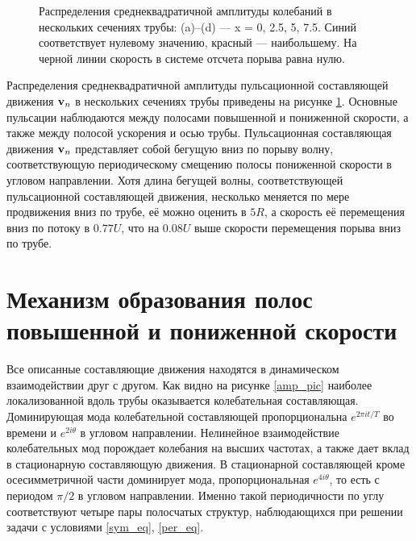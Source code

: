\begin{figure}[h]
\caption{Распределения среднеквадратичной амплитуды колебаний в нескольких сечениях трубы: (a)--(d) --- x = 0, 2.5, 5, 7.5. Синий соответствует нулевому значению, красный --- наибольшему. На черной линии скорость в системе отсчета порыва равна нулю.}
\label{puls_cs_pic}
\end{figure}

Распределения среднеквадратичной амплитуды пульсационной составляющей движения $\mathbf{v}_n$ в нескольких сечениях трубы приведены на рисунке \ref{puls_cs_pic}. Основные пульсации наблюдаются между полосами повышенной и пониженной скорости, а также между полосой ускорения и осью трубы. Пульсационная составляющая движения $\mathbf{v}_n$ представляет собой бегущую вниз по порыву волну, соответствующую периодическому смещению полосы пониженной скорости в угловом направлении. Хотя длина бегущей волны, соответствующей пульсационной составляющей движения, несколько меняется по мере продвижения вниз по трубе, её можно оценить в $5R$, а скорость её перемещения вниз по потоку в $0.77U$, что на $0.08U$ выше скорости перемещения порыва вниз по трубе.  


\section{Механизм образования полос повышенной и пониженной скорости} 

Все описанные составляющие движения находятся в динамическом взаимодействии друг с другом. Как видно на рисунке \ref{amp_pic} наиболее локализованной вдоль трубы оказывается колебательная составляющая. Доминирующая мода колебательной составляющей пропорциональна $e^{2\pi it/T}$ во времени и $e^{2i\theta}$ в угловом направлении. Нелинейное взаимодействие колебательных мод порождает колебания на высших частотах, а также дает вклад в стационарную составляющую движения. В стационарной составляющей кроме осесимметричной части доминирует мода, пропорциональная $e^{4i\theta}$, то есть с периодом $\pi/2$ в угловом направлении. Именно такой периодичности по углу соответствуют четыре пары полосчатых структур, наблюдающихся при решении задачи с условиями \eqref{sym_eq}, \eqref{per_eq}.

